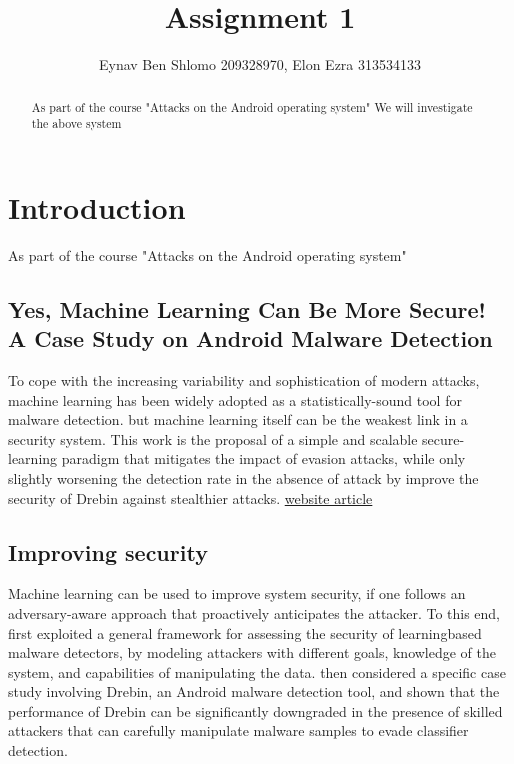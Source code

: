 \documentclass{article}
\title{
Assignment 1}
\author{Eynav Ben Shlomo 209328970, Elon Ezra 313534133}
\begin{document}
\maketitle

\begin{abstract}
As part of the course "Attacks on the Android operating system" We will investigate the above system
\end{abstract}

\section{Introduction}

As part of the course "Attacks on the Android operating system" 
\begin{multicols}{2}


\section{Yes, Machine Learning Can Be More Secure! A Case Study on Android Malware Detection }
To cope with the increasing variability and sophistication of modern attacks, machine learning has been widely adopted as a
statistically-sound tool for malware detection. but machine learning itself can be the weakest link in a security system.
This work is the proposal of a simple and scalable secure-learning paradigm that mitigates the impact of evasion attacks, while only slightly worsening the detection rate in the absence of attack by improve the security of Drebin against stealthier attacks.
\href{https://arxiv.org/abs/1704.08996}{website article}



\subsection{Improving security}
Machine learning can be used to improve system security,
if one follows an adversary-aware approach that proactively
anticipates the attacker. To this end,  first exploited
a general framework for assessing the security of learningbased malware detectors, by modeling attackers with different goals, knowledge of the system, and capabilities of
manipulating the data. then considered a specific
case study involving Drebin, an Android malware detection
tool, and shown that the performance of Drebin can be significantly downgraded in the presence of skilled attackers
that can carefully manipulate malware samples to evade
classifier detection.


\end{multicols}
\end{document}
